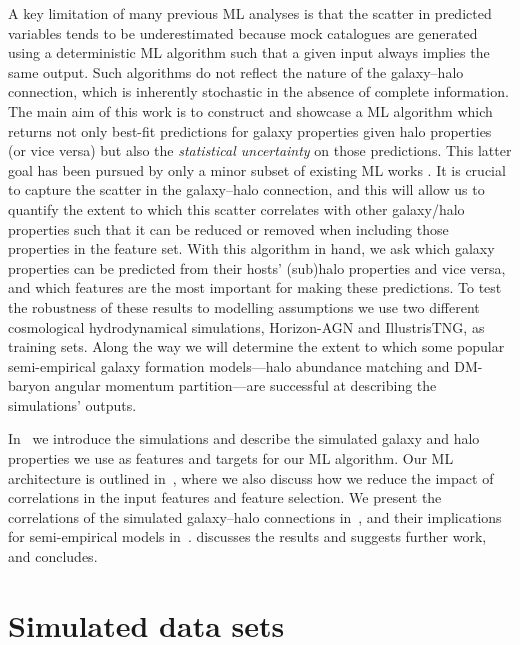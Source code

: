 \documentclass[usenatbib,useAMS]{mnras}
\begin{document}
A key limitation of many previous ML analyses is that the scatter in predicted variables tends to be underestimated \citep{Kamdar_2016,Agarwal_2018} because mock catalogues are generated using a deterministic ML algorithm such that a given input always implies the same output. Such algorithms do not reflect the nature of the galaxy--halo connection, which is inherently stochastic in the absence of complete information. The main aim of this work is to construct and showcase a ML algorithm which returns not only best-fit predictions for galaxy properties given halo properties (or vice versa) but also the \emph{statistical uncertainty} on those predictions. This latter goal has been pursued by only a minor subset of existing ML works \citep[e.g.][]{Ramanah2020MLUncertainties, Ramanah2021MLUncertainties, Ho2021MLUncertainties, Eisert2022ErgoML}. It is crucial to capture the scatter in the galaxy--halo connection, and this will allow us to quantify the extent to which this scatter correlates with other galaxy/halo properties such that it can be reduced or removed when including those properties in the feature set. With this algorithm in hand, we ask which galaxy properties can be predicted from their hosts' (sub)halo properties and vice versa, and which features are the most important for making these predictions. To test the robustness of these results to modelling assumptions we use two different cosmological hydrodynamical simulations, Horizon-AGN and IllustrisTNG, as training sets. Along the way we will determine the extent to which some popular semi-empirical galaxy formation models---halo abundance matching and DM-baryon angular momentum partition---are successful at describing the simulations' outputs.

In~ we introduce the simulations and describe the simulated galaxy and halo properties we use as features and targets for our ML algorithm. Our ML architecture is outlined in~, where we also discuss how we reduce the impact of correlations in the input features and feature selection. We present the correlations of the simulated galaxy--halo connections in~, and their implications for semi-empirical models in~.  discusses the results and suggests further work, and  concludes.

\section{Simulated data sets}\label{sec:Data sets}
\end{document}
